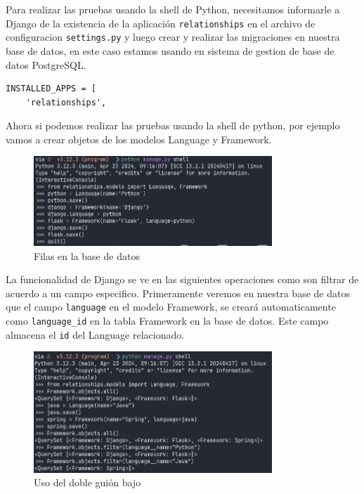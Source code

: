 \documentclass[10pt, a4paper]{article}
\newcommand{\mpy}[1]{\texttt{#1}}
\begin{document}
Para realizar las pruebas usando la shell de Python, necesitamos informarle a Django de la existencia de la aplicación \mpy{relationships} en el archivo de configuracion \mpy{settings.py} y luego crear y realizar las migraciones en nuestra base de datos, en este caso estamos usando en sistema de gestion de base de datos PostgreSQL.

\begin{verbatim}
INSTALLED_APPS = [
    'relationships',
\end{verbatim}

Ahora si podemos realizar las pruebas usando la shell de python, por ejemplo vamos a crear objetos de los modelos Language y Framework.

\begin{figure}[H]
  \centering
  \includegraphics[width=0.8\textwidth]{img/1_create_lan_fra.png}
  \caption{Filas en la base de datos}
\end{figure}

La funcionalidad de Django se ve en las siguientes operaciones como son filtrar de acuerdo a un campo especifico. Primeramente veremos en nuestra base de datos que el campo \mpy{language} en el modelo Framework, se creará automaticamente como \mpy{language_id} en la tabla  Framework en la base de datos. Este campo almacena el \mpy{id} del Language relacionado.
\singlespacing

\begin{figure}[H]
  \centering
  \includegraphics[width=0.8\textwidth]{img/2_filter.png}
  \caption{Uso del doble guión bajo}
\end{figure}
\end{document}
